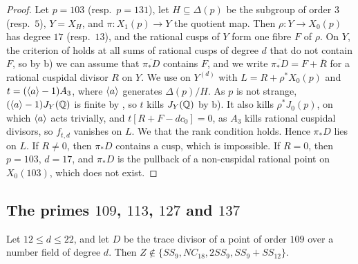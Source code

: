 \begin{proof}
Let $p=103$ (resp.\ $p=131$), let $H\subseteq\Delta(p)$ be the subgroup of order $3$ (resp.\ $5$), $Y=X_H$, and $\pi:X_1(p)\to Y$ the quotient map. Then $\rho:Y\to X_0(p)$ has degree $17$ (resp.\ $13$), and the rational cusps of $Y$ form one fibre $F$ of $\rho$. On $Y$, the criterion of  holds at all sums of rational cusps of degree $d$ that do not contain $F$, so by  b) we can assume that $\overline{\pi_*D}$ contains $F$, and we write $\overline{\pi_*D}=F+\overline R$ for a rational cuspidal divisor $R$ on $Y$. We use  on $Y^{(d)}$ with $L=R+\rho^*X_0(p)$ and $t=(\langle a\rangle-1)A_3$, where $\langle a\rangle$ generates $\Delta(p)/H$. As $p$ is not strange, $(\langle a\rangle-1)J_Y(\mathbb{Q})$ is finite by , so $t$ kills $J_Y(\mathbb{Q})$ by  b). It also kills $\rho^*J_0(p)$, on which $\langle a\rangle$ acts trivially, and $t[R+F-dc_0]=0$, as $A_3$ kills rational cuspidal divisors, so $f_{t,d}$ vanishes on $L$. We  that the rank condition holds. Hence $\pi_*D$ lies on $L$. If $R\neq0$, then $\pi_*D$ contains a cusp, which is impossible. If $R=0$, then $p=103$, $d=17$, and $\pi_*D$ is the pullback of a non-cuspidal rational point on $X_0(103)$, which does not exist.
\end{proof}

\subsection{The primes \texorpdfstring{$109$}{109}, \texorpdfstring{$113$}{113}, \texorpdfstring{$127$}{127} and \texorpdfstring{$137$}{137}}

\begin{proposition}\label{prop:109}
Let $12\leq d\leq 22$, and let $D$ be the trace divisor of a point of order $109$ over a number field of degree $d$. Then $Z\notin\{SS_9,NC_{18},2SS_9,SS_9+SS_{12}\}$.
\end{proposition}

